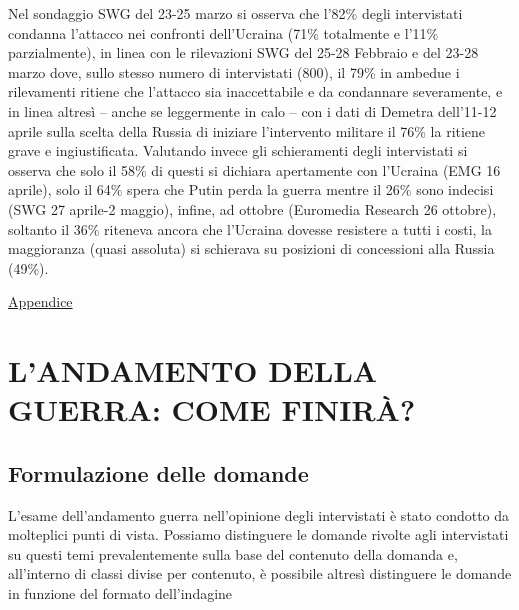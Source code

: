 \documentclass[
]{book}
\begin{document}
Nel sondaggio SWG del 23-25 marzo si osserva che l'82\% degli intervistati condanna l'attacco nei confronti dell'Ucraina (71\% totalmente e l'11\% parzialmente), in linea con le rilevazioni SWG del 25-28 Febbraio e del 23-28 marzo dove, sullo stesso numero di intervistati (800), il 79\% in ambedue i rilevamenti ritiene che l'attacco sia inaccettabile e da condannare severamente, e in linea altresì -- anche se leggermente in calo -- con i dati di Demetra dell'11-12 aprile sulla scelta della Russia di iniziare l'intervento militare il 76\% la ritiene grave e ingiustificata. Valutando invece gli schieramenti degli intervistati si osserva che solo il 58\% di questi si dichiara apertamente con l'Ucraina (EMG 16 aprile), solo il 64\% spera che Putin perda la guerra mentre il 26\% sono indecisi (SWG 27 aprile-2 maggio), infine, ad ottobre (Euromedia Research 26 ottobre), soltanto il 36\% riteneva ancora che l'Ucraina dovesse resistere a tutti i costi, la maggioranza (quasi assoluta) si schierava su posizioni di concessioni alla Russia (49\%).

\href{https://github.com/LucianaFazio/Ucrania/blob/main/PDF_Appendice/III.\%20Le\%20cause\%20della\%20guerra_v.5.pdf}{Appendice}

\hypertarget{landamento-della-guerra-come-finiruxe0}{%
\chapter{L'ANDAMENTO DELLA GUERRA: COME FINIRÀ?}\label{landamento-della-guerra-come-finiruxe0}}

\hypertarget{formulazione-delle-domande-2}{%
\section{Formulazione delle domande}\label{formulazione-delle-domande-2}}

L'esame dell'andamento guerra nell'opinione degli intervistati è stato condotto da molteplici punti di vista. Possiamo distinguere le domande rivolte agli intervistati su questi temi prevalentemente sulla base del contenuto della domanda e, all'interno di classi divise per contenuto, è possibile altresì distinguere le domande in funzione del formato dell'indagine
\end{document}
